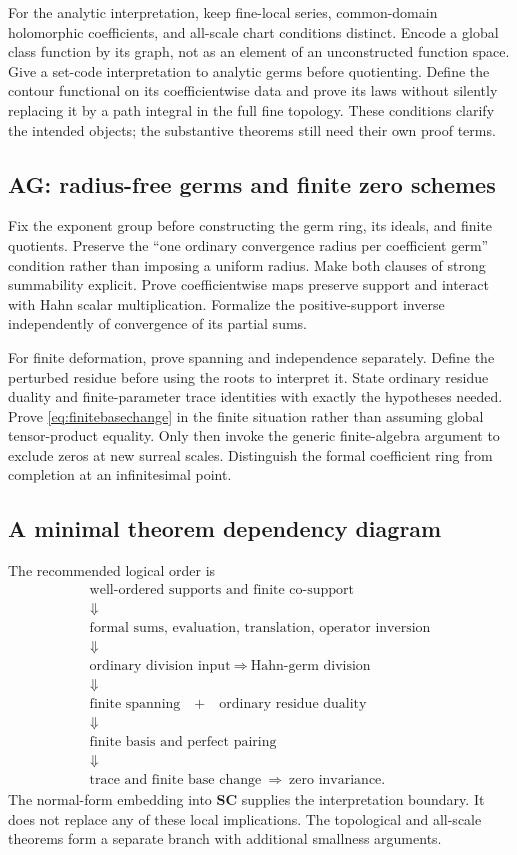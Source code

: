 \documentclass[11pt,letterpaper]{article}
\theoremstyle{definition}
\theoremstyle{remark}
\newcommand{\SC}{\mathbf{SC}}
\numberwithin{equation}{section}
\begin{document}
For the analytic interpretation, keep fine-local series, common-domain holomorphic coefficients, and all-scale chart conditions distinct. Encode a global class function by its graph, not as an element of an unconstructed function space. Give a set-code interpretation to analytic germs before quotienting. Define the contour functional on its coefficientwise data and prove its laws without silently replacing it by a path integral in the full fine topology. These conditions clarify the intended objects; the substantive theorems still need their own proof terms.

\subsection{AG: radius-free germs and finite zero schemes}
Fix the exponent group before constructing the germ ring, its ideals, and finite quotients. Preserve the ``one ordinary convergence radius per coefficient germ'' condition rather than imposing a uniform radius. Make both clauses of strong summability explicit. Prove coefficientwise maps preserve support and interact with Hahn scalar multiplication. Formalize the positive-support inverse independently of convergence of its partial sums.

For finite deformation, prove spanning and independence separately. Define the perturbed residue before using the roots to interpret it. State ordinary residue duality and finite-parameter trace identities with exactly the hypotheses needed. Prove \eqref{eq:finitebasechange} in the finite situation rather than assuming global tensor-product equality. Only then invoke the generic finite-algebra argument to exclude zeros at new surreal scales. Distinguish the formal coefficient ring from completion at an infinitesimal point.

\subsection{A minimal theorem dependency diagram}
The recommended logical order is
\[
\begin{gathered}
\text{well-ordered supports and finite co-support}\\
\Downarrow\\
\text{formal sums, evaluation, translation, operator inversion}\\
\Downarrow\\
\text{ordinary division input}\ \Longrightarrow\ \text{Hahn-germ division}\\
\Downarrow\\
\text{finite spanning}\quad+\quad\text{ordinary residue duality}\\
\Downarrow\\
\text{finite basis and perfect pairing}\\
\Downarrow\\
\text{trace and finite base change}\ \Longrightarrow\ \text{zero invariance}.
\end{gathered}
\]
The normal-form embedding into \(\SC\) supplies the interpretation boundary. It does not replace any of these local implications. The topological and all-scale theorems form a separate branch with additional smallness arguments.
\end{document}
